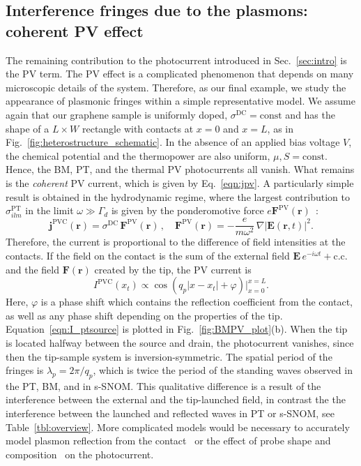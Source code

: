 \documentclass[aps, prb, reprint, superscriptaddress]{revtex4-2}
\renewcommand{\vec}{\mathbf}
\begin{document}
\subsection{Interference fringes due to the plasmons: coherent PV effect}
\label{ssec:PC}

The remaining contribution to the photocurrent introduced in Sec.~\ref{sec:intro} is the PV term.
The PV effect is a complicated phenomenon that depends on many microscopic details of the system. 
Therefore, as our final example, we study the appearance of plasmonic fringes within a simple
representative model.
We assume again that our graphene sample is uniformly doped, $\sigma^\mathrm{DC} = \text{const}$ and has the shape of a $L \times W$ rectangle with contacts at $x = 0$ and $x = L$, as in
Fig.~\ref{fig:heterostructure_schematic}.
In the absence of an applied bias voltage $V$,
the chemical potential and the thermopower are also uniform,
$\mu, S = \text{const}$.
Hence, the BM, PT, and the thermal PV photocurrents all vanish.
What remains is the \textit{coherent} PV current,
which is given by Eq.~\eqref{eqn:jpv}.
A particularly simple result is obtained in the hydrodynamic regime, where the largest contribution to $\sigma_{ilm}^{\mathrm{PT}}$ in the limit $\omega\gg \Gamma_d$ is given by the ponderomotive force $e\vec{F}^{\mathrm{PV}}(\vec{r})$~\cite{Aliev1992,Sun2018}: 
\begin{equation}
\label{eqn:j_PV_ponder}
\vec{j}^\mathrm{PVC}(\vec{r})
= \sigma^\mathrm{DC}\, \vec{F}^{\mathrm{PV}}(\vec{r})\,,
\quad  \vec{F}^{\mathrm{PV}}(\vec{r}) = -\frac{e}{m \omega^2}\, \nabla \left|\vec{E}(\vec{r}, t)\right|^2. \end{equation}
Therefore, the current is proportional to the difference of field intensities at the contacts.
If the field on the contact is the sum of the  external field $\vec{E}\, e^{-i\omega t} + \mathrm{c.c.}$ and the field $\vec{F}(\vec{r})$ created by the tip, the PV current is
\begin{equation}
I^{\mathrm{PVC}}(x_t)\propto \cos(q_p |x - x_t| + \varphi)\bigg|^{x = L}_{x = 0}. 
\label{eqn:I_ptsource}
\end{equation}
Here, $\varphi$ is a phase shift which contains the reflection coefficient from the contact, as well as any phase shift depending on the properties of the tip. 
Equation~\eqref{eqn:I_ptsource} is plotted in Fig.~\ref{fig:BMPV_plot}(b). 
When the tip is located halfway between the source and drain, the photocurrent vanishes, since then the tip-sample system is inversion-symmetric. 
The spatial period of the fringes is $\lambda_p = {2\pi} / {q_p}$, which is twice the period of the standing waves observed in the PT, BM, and in s-SNOM.
This qualitative difference is a result of the interference between the external and the tip-launched field, in contrast the the interference between the launched and reflected waves in PT or s-SNOM,
see Table~\ref{tbl:overview}.
More complicated models would be necessary to accurately model plasmon reflection from the contact~\cite{Rejaei2015} or the effect of probe shape and composition~\cite{Jiang2016} on the photocurrent. 
\end{document}
